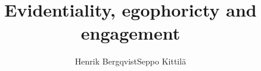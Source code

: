 \author{Henrik Bergqvist\lastand Seppo Kittilä} %
\title{Evidentiality, egophoricty and engagement}  

\renewcommand{\lsSeries}{sidl} %
\renewcommand{\lsSeriesNumber}{99} %



\renewcommand{\lsISBNdigital}{000-0-000000-00-0}
\renewcommand{\lsISBNhardcover}{000-0-000000-00-0} 
